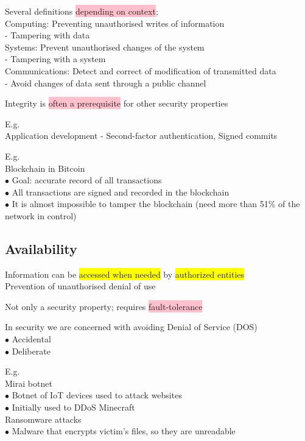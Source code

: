 \documentclass[tikz,border=10pt]{project_plan}
\newcommand{\bulletPoint}{\hspace{-3.1pt}$\bullet$ \hspace{5pt}}
\begin{document}
Several definitions \colorbox{pink}{depending on context};\\
Computing: Preventing unauthorised writes of information\\
- Tampering with data \\
Systems: Prevent unauthorised changes of the system\\
- Tampering with a system \\
Communications: Detect and correct of modification of transmitted data\\
- Avoid changes of data sent through a public channel

Integrity is \colorbox{pink}{often a prerequisite} for other security properties

E.g.\\
Application development - Second-factor authentication, Signed commits

E.g.\\
Blockchain in Bitcoin\\
\bulletPoint Goal: accurate record of all transactions\\
\bulletPoint All transactions are signed and recorded in the blockchain\\
\bulletPoint It is almost impossible to tamper the blockchain (need more than 51\% of the network in control)

\subsection{Availability}
Information can be \colorbox{yellow}{accessed when needed} by \colorbox{yellow}{authorized entities}\\
Prevention of unauthorised denial of use

Not only a security property; requires \colorbox{pink}{fault-tolerance}

In security we are concerned with avoiding Denial of Service (DOS)\\
\bulletPoint Accidental\\
\bulletPoint Deliberate

E.g.\\
Mirai botnet\\
\bulletPoint Botnet of IoT devices used to attack websites\\
\bulletPoint Initially used to DDoS Minecraft\\
Ransomware attacks\\
\bulletPoint Malware that encrypts victim's files, so they are unreadable
\end{document}
